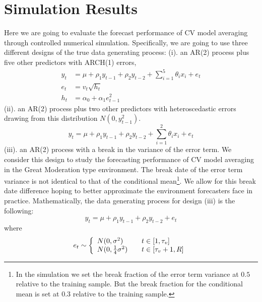 \section{Simulation Results}
Here we are going to evaluate the forecast performance of CV model averaging through controlled numerical simulation. Specifically, we are going to use three different designs of the true data generating process: (i). an AR(2) process plus five other predictors with ARCH(1) errors,
\begin{subequations}
            \begin{align}
                y_{t} & = \mu + \rho_{1}y_{t-1} + \rho_{2}y_{t-2} + \sum_{i=1}^{5}\theta_{i}x_{i} + e_{t} \\
                e_{t} & = v_{t}\sqrt{h_{t}}\\
                h_{t} & = \alpha_{0} + \alpha_{1}e_{t-1}^2
            \end{align}
\end{subequations}
(ii). an AR(2) process plus two other predictors with heteroscedastic errors drawing from this distribution $N(0,y_{t-1}^2)$.
\begin{equation}
                y_{t} = \mu + \rho_{1}y_{t-1} + \rho_{2}y_{t-2} + \sum_{i=1}^{2}\theta_{i}x_{i} + e_{t}
\end{equation}
(iii). an AR(2) process with a break in the variance of the error term. We consider this design to study the forecasting performance of CV model averaging in the Great Moderation type environment. The break date of the error term variance is not identical to that of the conditional mean\footnote{In the simulation we set the break fraction of the error term variance at $0.5$ relative to the training sample. But the break fraction for the conditional mean is set at $0.3$ relative to the training sample.}. We allow for this break date difference hoping to better approximate the environment forecasters face in practice. Mathematically, the data generating process for design (iii) is the following:
\begin{equation}
            y_{t} = \mu + \rho_{1}y_{t-1} + \rho_{2}y_{t-2} + e_{t} 
\end{equation}
where
\[ e_{t} \sim \left\{
  \begin{array}{l l}
    N(0,\sigma^2) & \quad t \in [1,\tau_{v}]\\
    N(0,\frac{1}{4}\sigma^2) & \quad t \in [\tau_{v}+1, R]
\end{array} \right.\]

